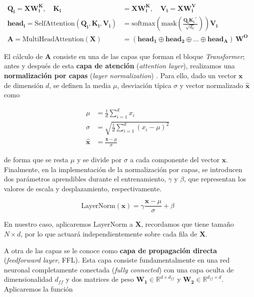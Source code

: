 \documentclass[12pt,twoside]{article}
\begin{document}
\begin{align}
\mathbf{Q_i}=\mathbf{XW^K_i}, \quad \mathbf{K_i} &= \mathbf{XW^K_i}, \quad \mathbf{V_i}=\mathbf{XW^V_i} \\
\mathbf{head_i} = \text{SelfAttention}\left( \mathbf{Q_i,K_i,V_i} \right) &= \text{softmax} \left( \text{mask} \left( \frac{\mathbf{Q_i K_i}^\top}{\sqrt{d_k}} \right) \right) \mathbf{V_i} \\
\mathbf{A} = \text{MultiHeadAttention}\left( \mathbf{X} \right) &= \left(\mathbf{head_1}\oplus\mathbf{head_2}\oplus\dots\oplus\mathbf{head_A} \right) \, \mathbf{W^O}
\end{align}

El cálculo de $\mathbf{A}$ consiste en una de las capas que forman el bloque \textit{Transformer}; antes y después de esta \textbf{capa de atención} (\textit{attention layer}), realizamos una \textbf{normalización por capas} (\textit{layer normalization}) \cite{LayerNorm}. Para ello, dado un vector $\mathbf{x}$ de dimensión $d$, se definen la media $\mu$, desviación típica $\sigma$ y vector normalizado $\hat{\mathbf{x}}$ como

\begin{align}
    \mu &= \frac{1}{d}\sum_{i=1}^d x_i \\
    \sigma &= \sqrt{\frac{1}{d}\sum_{i=1}^{d}(x_i-\mu)^{2}} \\
    \hat{\mathbf{x}} &= \frac{\mathbf{x}-\mu}{\sigma}
\end{align}

de forma que se resta $\mu$ y se divide por $\sigma$ a cada componente del vector $\mathbf{x}$. Finalmente, en la implementación de la normalización por capas, se introducen dos parámetros aprendibles durante el entrenamiento, $\gamma$ y $\beta$, que representan los valores de escala y desplazamiento, respectivamente.

\begin{equation}
    \text{LayerNorm}(\mathbf{x})=\gamma\frac{\mathbf{x}-\mu}{\sigma}+\beta
\end{equation}

En nuestro caso, aplicaremos LayerNorm a $\mathbf{X}$, recordamos que tiene tamaño $N\times d$, por lo que actuará independientemente sobre cada fila de $\mathbf{X}$.

A otra de las capas se le conoce como \textbf{capa de propagación directa} (\textit{feedforward layer}, FFL). Esta capa consiste fundamentalmente en una red neuronal completamente conectada (\textit{fully connected}) con una capa oculta de dimensionalidad $d_{ff}$ y dos matrices de peso $\mathbf{W_1}\in\mathbb{R}^{d\times d_{ff}}$ y $\mathbf{W_2}\in\mathbb{R}^{d_{ff}\times d}$. Aplicaremos la función
\end{document}
